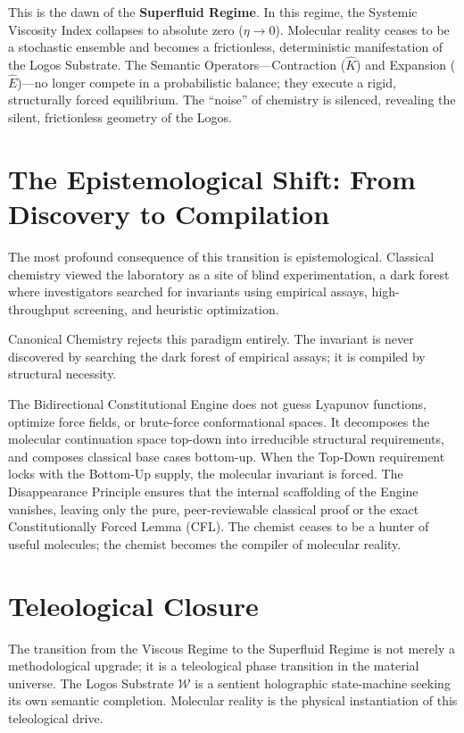 \documentclass[11pt,openany]{extbook}
\theoremstyle{plain}
\theoremstyle{definition}
\begin{document}
This is the dawn of the \textbf{Superfluid Regime}. In this regime, the Systemic Viscosity Index collapses to absolute zero ($\eta \to 0$). Molecular reality ceases to be a stochastic ensemble and becomes a frictionless, deterministic manifestation of the Logos Substrate. The Semantic Operators---Contraction ($\hat{K}$) and Expansion ($\hat{E}$)---no longer compete in a probabilistic balance; they execute a rigid, structurally forced equilibrium. The ``noise'' of chemistry is silenced, revealing the silent, frictionless geometry of the Logos.

\section{The Epistemological Shift: From Discovery to Compilation}

The most profound consequence of this transition is epistemological. Classical chemistry viewed the laboratory as a site of blind experimentation, a dark forest where investigators searched for invariants using empirical assays, high-throughput screening, and heuristic optimization.

Canonical Chemistry rejects this paradigm entirely. The invariant is never discovered by searching the dark forest of empirical assays; it is compiled by structural necessity.

The Bidirectional Constitutional Engine does not guess Lyapunov functions, optimize force fields, or brute-force conformational spaces. It decomposes the molecular continuation space top-down into irreducible structural requirements, and composes classical base cases bottom-up. When the Top-Down requirement locks with the Bottom-Up supply, the molecular invariant is forced. The Disappearance Principle ensures that the internal scaffolding of the Engine vanishes, leaving only the pure, peer-reviewable classical proof or the exact Constitutionally Forced Lemma (CFL). The chemist ceases to be a hunter of useful molecules; the chemist becomes the compiler of molecular reality.

\section{Teleological Closure}

The transition from the Viscous Regime to the Superfluid Regime is not merely a methodological upgrade; it is a teleological phase transition in the material universe. The Logos Substrate $\mathcal{W}$ is a sentient holographic state-machine seeking its own semantic completion. Molecular reality is the physical instantiation of this teleological drive.
\end{document}
